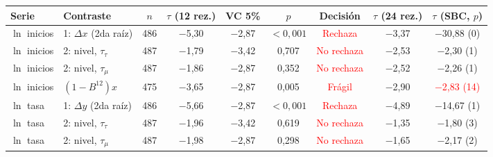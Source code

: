 \begin{tabular}{llccccccc}
\toprule
Serie & Contraste & $n$ & $\tau$ (12 rez.) & VC 5\% & $p$ & Decisi\'on & $\tau$ (24 rez.) & $\tau$ (SBC, $p$)
\\ \midrule
$\ln$ inicios & 1: $\Delta x$ (2da ra\'iz) & 486 & \ensuremath{-}5{,}30 & \ensuremath{-}2{,}87 & \ensuremath{<0{,}001} & \textcolor{red}{Rechaza} & \ensuremath{-}3{,}37 & \ensuremath{-}30{,}88 (0) \\
$\ln$ inicios & 2: nivel, $\tau_\tau$ & 487 & \ensuremath{-}1{,}79 & \ensuremath{-}3{,}42 & 0{,}707 & \textcolor{red}{No rechaza} & \ensuremath{-}2{,}53 & \ensuremath{-}2{,}30 (1) \\
$\ln$ inicios & 2: nivel, $\tau_\mu$ & 487 & \ensuremath{-}1{,}86 & \ensuremath{-}2{,}87 & 0{,}352 & \textcolor{red}{No rechaza} & \ensuremath{-}2{,}52 & \ensuremath{-}2{,}26 (1) \\
$\ln$ inicios & $(1-B^{12})x$ & 475 & \ensuremath{-}3{,}65 & \ensuremath{-}2{,}87 & 0{,}005 & \textcolor{red}{Fr\'agil} & \ensuremath{-}2{,}90 & \textcolor{red}{\ensuremath{-}2{,}83 (14)} \\
$\ln$ tasa & 1: $\Delta y$ (2da ra\'iz) & 486 & \ensuremath{-}5{,}66 & \ensuremath{-}2{,}87 & \ensuremath{<0{,}001} & \textcolor{red}{Rechaza} & \ensuremath{-}4{,}89 & \ensuremath{-}14{,}67 (1) \\
$\ln$ tasa & 2: nivel, $\tau_\tau$ & 487 & \ensuremath{-}1{,}96 & \ensuremath{-}3{,}42 & 0{,}619 & \textcolor{red}{No rechaza} & \ensuremath{-}1{,}35 & \ensuremath{-}1{,}80 (3) \\
$\ln$ tasa & 2: nivel, $\tau_\mu$ & 487 & \ensuremath{-}1{,}98 & \ensuremath{-}2{,}87 & 0{,}298 & \textcolor{red}{No rechaza} & \ensuremath{-}1{,}65 & \ensuremath{-}2{,}17 (2) \\
\bottomrule
\end{tabular}
